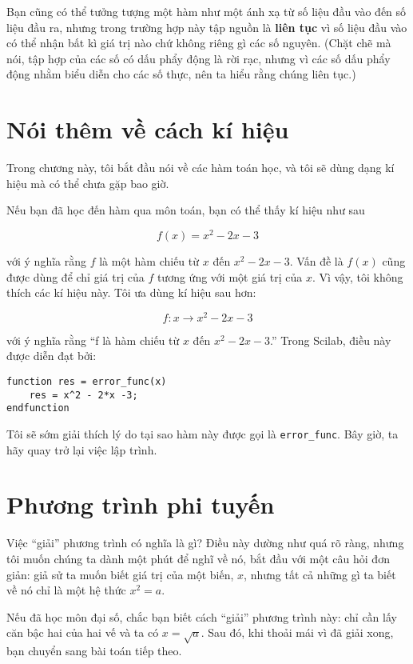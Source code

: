\documentclass[12pt]{book}
\begin{document}
Bạn cũng có thể tưởng tượng một hàm như một ánh xạ từ số liệu đầu vào
đến số liệu đầu ra, nhưng trong trường hợp này tập nguồn là 
{\bf liên tục} vì số liệu đầu vào có thể nhận bất kì giá trị nào chứ không
riêng gì các số nguyên. (Chặt chẽ mà nói, tập hợp của các số có dấu 
phẩy động là rời rạc, nhưng vì các số dấu phẩy động nhằm biểu diễn
cho các số thực, nên ta hiểu rằng chúng liên tục.)


\section{Nói thêm về cách kí hiệu}
\label{notation}

Trong chương này, tôi bắt đầu nói về các hàm toán học, và tôi sẽ
dùng dạng kí hiệu mà có thể chưa gặp bao giờ.

Nếu bạn đã học đến hàm qua môn toán, bạn có thể thấy kí hiệu
như sau

\[ f(x) = x^2 - 2x -3 \]

với ý nghĩa rằng $f$ là một hàm chiếu từ
$x$ đến $x^2 - 2x -3$.  Vấn đề là $f(x)$ cũng được dùng để chỉ
giá trị của $f$ tương ứng với một giá trị của $x$. Vì vậy, tôi 
không thích các kí hiệu này. Tôi ưa dùng kí hiệu sau hơn:

\[ f : x \to x^2 - 2x -3 \]

với ý nghĩa rằng ``f là hàm chiếu từ
$x$ đến $x^2 - 2x -3$.''  Trong Scilab, điều này được diễn đạt
bởi:

\begin{verbatim}
function res = error_func(x)
    res = x^2 - 2*x -3;
endfunction
\end{verbatim}

Tôi sẽ sớm giải thích lý do tại sao hàm này được gọi là 
\texttt{error\_func}. Bây giờ, ta hãy quay trở lại việc lập trình.



\section{Phương trình phi tuyến}

Việc ``giải'' phương trình có nghĩa là gì? Điều này dường như quá
rõ ràng, nhưng tôi muốn chúng ta dành một phút để nghĩ về nó,
bắt đầu với một câu hỏi đơn giản: giả sử ta muốn biết giá trị của
một biến, $x$, nhưng tất cả những gì ta biết về nó chỉ là một 
hệ thức $x^2 = a$.

Nếu đã học môn đại số, chắc bạn biết cách ``giải'' phương trình
này: chỉ cần lấy căn bậc hai của hai vế và ta có $x = \sqrt{a}$. 
Sau đó, khi thoải mái vì đã giải xong, bạn chuyển sang bài toán
tiếp theo.
\end{document}
